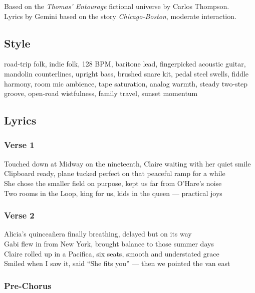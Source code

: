 Based on the \emph{Thomas' Entourage} fictional universe by Carlos
Thompson.\\
Lyrics by Gemini based on the story \emph{Chicago-Boston}, moderate
interaction.

\subsection{Style}\label{style-29}

road-trip folk, indie folk, 128 BPM, baritone lead, fingerpicked
acoustic guitar, mandolin counterlines, upright bass, brushed snare kit,
pedal steel swells, fiddle harmony, room mic ambience, tape saturation,
analog warmth, steady two-step groove, open-road wistfulness, family
travel, sunset momentum

\subsection{Lyrics}\label{lyrics-29}

\subsubsection{Verse 1}\label{verse-1-25}

Touched down at Midway on the nineteenth, Claire waiting with her quiet
smile\\
Clipboard ready, plane tucked perfect on that peaceful ramp for a
while\\
She chose the smaller field on purpose, kept us far from O'Hare's
noise\\
Two rooms in the Loop, king for us, kids in the queen --- practical joys

\subsubsection{Verse 2}\label{verse-2-25}

Alicia's quinceañera finally breathing, delayed but on its way\\
Gabi flew in from New York, brought balance to those summer days\\
Claire rolled up in a Pacifica, six seats, smooth and understated
grace\\
Smiled when I saw it, said ``She fits you'' --- then we pointed the van
east

\subsubsection{Pre-Chorus}\label{pre-chorus-41}

